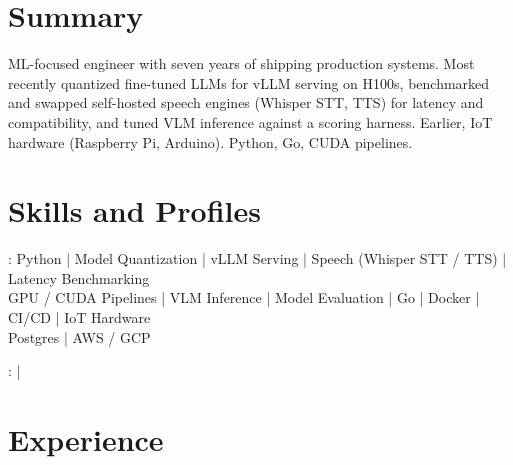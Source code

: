 \documentclass[print]{jack-resume}
\begin{document}
\pagecolor{darkmodeBackground}


\begin{minipage}[t][1cm][t]{.03\textwidth}
    \hfill
\end{minipage}

\section{Summary}
ML-focused engineer with seven years of shipping production systems. Most recently quantized fine-tuned LLMs for vLLM serving on H100s, benchmarked and swapped self-hosted speech engines (Whisper STT, TTS) for latency and compatibility, and tuned VLM inference against a scoring harness. Earlier, IoT hardware (Raspberry Pi, Arduino). Python, Go, CUDA pipelines.
\sectionsep

\section{Skills and Profiles}
:
Python \hfill | \hfill
Model Quantization \hfill | \hfill
vLLM Serving \hfill | \hfill
Speech (Whisper STT / TTS) \hfill | \hfill
Latency Benchmarking \\
\hspace{1.0cm} GPU / CUDA Pipelines \hfill | \hfill
VLM Inference \hfill | \hfill
Model Evaluation \hfill | \hfill
Go \hfill | \hfill
Docker \hfill | \hfill
CI/CD \hfill | \hfill
IoT Hardware \\
\hspace{1.0cm} Postgres \hfill | \hfill
AWS / GCP \\

\raggedright{
    :
      \href{https://www.linkedin.com/in/jack-sturtevant/}{ \ExternalLink} |
     \href{https://github.com/jacksturt}{ \ExternalLink}}

\section{Experience}
\end{document}
